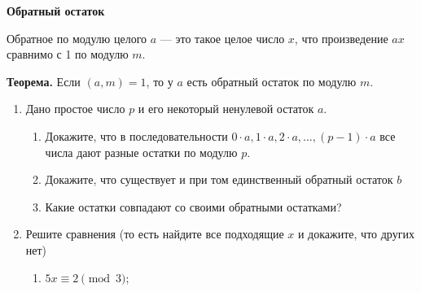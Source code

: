 \documentclass{article}
\begin{document}
\large
	
	
	\begin{center}
		\textbf{Обратный остаток}
	\end{center}

Обратное по модулю целого $a$ --- это такое целое число $x$, что произведение $ax$ сравнимо с 1 по модулю $m$.

\textbf{Теорема.} Если $(a,m) = 1$, то у $a$ есть обратный остаток по модулю $m$.


\begin{enumerate}[label*=\protect\fbox{\arabic{enumi}}]
	
\item Дано простое число $p$ и его некоторый ненулевой остаток $a$.
	\begin{enumerate}
		\item Докажите, что в последовательности $0 \cdot a, 1 \cdot a, 2 \cdot a, \dots ,(p - 1) \cdot a$ все числа дают разные остатки по модулю $p$.
		
		\item Докажите, что существует и при том единственный обратный остаток $b$
		
		\item Какие остатки совпадают со своими обратными остатками?
	\end{enumerate}







\item 
Решите сравнения (то есть найдите все подходящие $x$ и докажите, что других
нет)
\begin{enumerate}
	\item $5x \equiv 2 \pmod 3$;
	

\end{enumerate}
\end{enumerate}
\end{document}

